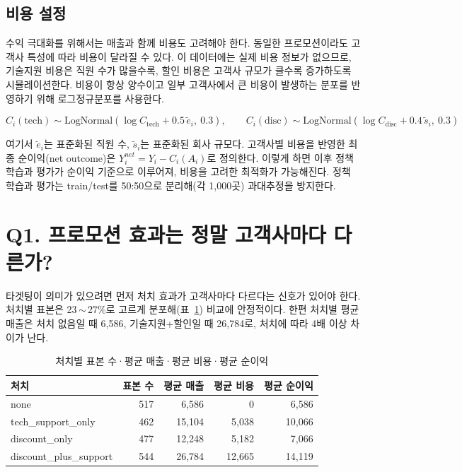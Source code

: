 \documentclass[11pt]{article}
\begin{document}
\subsection{비용 설정}

수익 극대화를 위해서는 매출과 함께 비용도 고려해야 한다. 동일한 프로모션이라도 고객사 특성에 따라 비용이 달라질 수 있다. 이 데이터에는 실제 비용 정보가 없으므로, 기술지원 비용은 직원 수가 많을수록, 할인 비용은 고객사 규모가 클수록 증가하도록 시뮬레이션한다. 비용이 항상 양수이고 일부 고객사에서 큰 비용이 발생하는 분포를 반영하기 위해 로그정규분포를 사용한다.

\[
C_i(\text{tech}) \sim \text{LogNormal}(\log C_{\text{tech}} + 0.5\,\tilde{e}_i,\ 0.3), \qquad
C_i(\text{disc}) \sim \text{LogNormal}(\log C_{\text{disc}} + 0.4\,\tilde{s}_i,\ 0.3)
\]

여기서 $\tilde{e}_i$는 표준화된 직원 수, $\tilde{s}_i$는 표준화된 회사 규모다. 고객사별 비용을 반영한 최종 순이익(net outcome)은 $Y_i^{net} = Y_i - C_i(A_i)$로 정의한다. 이렇게 하면 이후 정책 학습과 평가가 순이익 기준으로 이루어져, 비용을 고려한 최적화가 가능해진다. 정책 학습과 평가는 train/test를 50:50으로 분리해(각 1{,}000곳) 과대추정을 방지한다.

\section{Q1. 프로모션 효과는 정말 고객사마다 다른가?}

타겟팅이 의미가 있으려면 먼저 처치 효과가 고객사마다 다르다는 신호가 있어야 한다. 처치별 표본은 23\,$\sim$\,27\%로 고르게 분포해(표~\ref{tab:summary}) 비교에 안정적이다. 한편 처치별 평균 매출은 처치 없음일 때 6{,}586, 기술지원+할인일 때 26{,}784로, 처치에 따라 4배 이상 차이가 난다.

\begin{table}[h]
\centering
\small
\caption{처치별 표본 수·평균 매출·평균 비용·평균 순이익}
\label{tab:summary}
\begin{tabular}{lrrrr}
\toprule
처치 & 표본 수 & 평균 매출 & 평균 비용 & 평균 순이익 \\
\midrule
none & 517 & 6{,}586 & 0 & 6{,}586 \\
tech\_support\_only & 462 & 15{,}104 & 5{,}038 & 10{,}066 \\
discount\_only & 477 & 12{,}248 & 5{,}182 & 7{,}066 \\
discount\_plus\_support & 544 & 26{,}784 & 12{,}665 & 14{,}119 \\
\bottomrule
\end{tabular}
\end{table}
\end{document}
